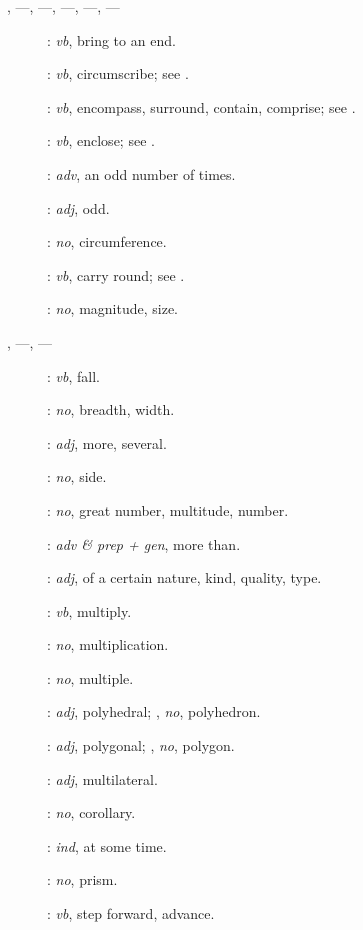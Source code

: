 {\begin{description}
\item[, ---, ---, ---, ---, ---]: {\em vb}, bring to an end.
\item[]: {\em vb}, circumscribe; see .
\item[]: {\em vb},
encompass, surround, contain, comprise; see .
\item[]: {\em vb}, enclose; see .
\item[]: {\em adv}, an odd number of times.
\item[]: {\em adj}, odd.
\item[]: {\em no}, circumference.
\item[]: {\em vb}, carry round; see .
\item[]: {\em no}, magnitude, size.
\item[, ---, ---]: {\em vb}, fall.
\item[]: {\em no}, breadth, width.
\item[]: {\em adj}, more, several.
\item[]: {\em no}, side.
\item[]: {\em no}, great number, multitude, number.
\item[]: {\em adv \& prep + gen}, more than.
\item[]: {\em adj}, of a certain nature, kind, quality, type.
\item[]: {\em vb}, multiply.
\item[]: {\em no}, multiplication.
\item[]: {\em no}, multiple.
\item[]: {\em adj}, polyhedral; , {\em no}, polyhedron.
\item[]: {\em adj}, polygonal; , {\em no}, polygon.
\item[]: {\em adj}, multilateral.
\item[]: {\em no}, corollary.
\item[]: {\em ind}, at some time.
\item[]: {\em no}, prism.
\item[]: {\em vb}, step forward, advance.

\end{description}}
